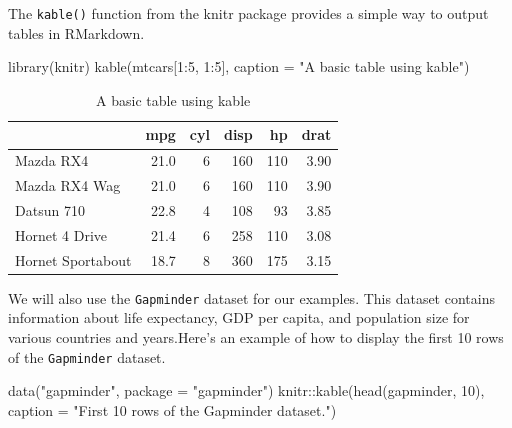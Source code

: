 \documentclass[
]{book}
\newenvironment{Shaded}{\begin{snugshade}}{\end{snugshade}}
\newcommand{\AttributeTok}[1]{\textcolor[rgb]{0.77,0.63,0.00}{#1}}
\newcommand{\DecValTok}[1]{\textcolor[rgb]{0.00,0.00,0.81}{#1}}
\newcommand{\FunctionTok}[1]{\textcolor[rgb]{0.00,0.00,0.00}{#1}}
\newcommand{\NormalTok}[1]{#1}
\newcommand{\SpecialCharTok}[1]{\textcolor[rgb]{0.00,0.00,0.00}{#1}}
\newcommand{\StringTok}[1]{\textcolor[rgb]{0.31,0.60,0.02}{#1}}
\begin{document}
The \texttt{kable()} function from the knitr package provides a simple way to output tables in RMarkdown.

\begin{Shaded}
\begin{Highlighting}[]
\FunctionTok{library}\NormalTok{(knitr)}
\FunctionTok{kable}\NormalTok{(mtcars[}\DecValTok{1}\SpecialCharTok{:}\DecValTok{5}\NormalTok{, }\DecValTok{1}\SpecialCharTok{:}\DecValTok{5}\NormalTok{], }\AttributeTok{caption =} \StringTok{"A basic table using kable"}\NormalTok{)}
\end{Highlighting}
\end{Shaded}

\begin{table}

\caption{\label{tab:unnamed-chunk-1}A basic table using kable}
\centering
\begin{tabular}[t]{l|r|r|r|r|r}
\hline
  & mpg & cyl & disp & hp & drat\\
\hline
Mazda RX4 & 21.0 & 6 & 160 & 110 & 3.90\\
\hline
Mazda RX4 Wag & 21.0 & 6 & 160 & 110 & 3.90\\
\hline
Datsun 710 & 22.8 & 4 & 108 & 93 & 3.85\\
\hline
Hornet 4 Drive & 21.4 & 6 & 258 & 110 & 3.08\\
\hline
Hornet Sportabout & 18.7 & 8 & 360 & 175 & 3.15\\
\hline
\end{tabular}
\end{table}

We will also use the \texttt{Gapminder} dataset for our examples. This dataset contains information about life expectancy, GDP per capita, and population size for various countries and years.Here's an example of how to display the first 10 rows of the \texttt{Gapminder} dataset.

\begin{Shaded}
\begin{Highlighting}[]
\FunctionTok{data}\NormalTok{(}\StringTok{"gapminder"}\NormalTok{, }\AttributeTok{package =} \StringTok{"gapminder"}\NormalTok{)}
\NormalTok{knitr}\SpecialCharTok{::}\FunctionTok{kable}\NormalTok{(}\FunctionTok{head}\NormalTok{(gapminder, }\DecValTok{10}\NormalTok{), }\AttributeTok{caption =} \StringTok{"First 10 rows of the Gapminder dataset."}\NormalTok{)}
\end{Highlighting}
\end{Shaded}
\end{document}
